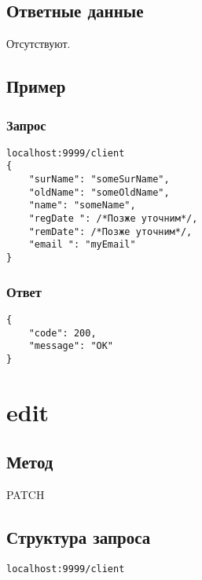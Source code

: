 \section*{Ответные данные}
Отсутствуют.

\section*{Пример}

\subsection*{Запрос}

\begin{lstlisting}
localhost:9999/client
{
	"surName": "someSurName",
	"oldName": "someOldName",
	"name": "someName",
	"regDate ": /*Позже уточним*/,
	"remDate": /*Позже уточним*/,
	"email ": "myEmail"
}
\end{lstlisting}
\hfill

\subsection*{Ответ}

\begin{lstlisting}
{
	"code": 200,
	"message": "OK"
}
\end{lstlisting}
\hfill


\chapter{edit}

\section*{Метод}
PATCH

\section*{Структура запроса}
\begin{lstlisting}
localhost:9999/client
\end{lstlisting}
\hfill

